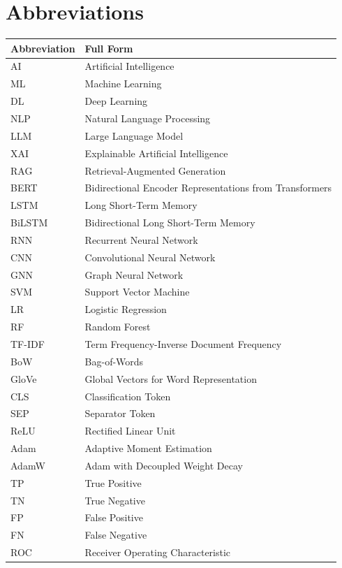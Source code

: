 \sloppy
\pagestyle{fancy}
\chapter*{\centering Abbreviations}

\begin{longtable}{p{1.6in} p{4.0in}}
\textbf{Abbreviation} & \textbf{Full Form} \\
\hline
\endhead
AI & Artificial Intelligence \\
ML & Machine Learning \\
DL & Deep Learning \\
NLP & Natural Language Processing \\
LLM & Large Language Model \\
XAI & Explainable Artificial Intelligence \\
RAG & Retrieval-Augmented Generation \\
BERT & Bidirectional Encoder Representations from Transformers \\
LSTM & Long Short-Term Memory \\
BiLSTM & Bidirectional Long Short-Term Memory \\
RNN & Recurrent Neural Network \\
CNN & Convolutional Neural Network \\
GNN & Graph Neural Network \\
SVM & Support Vector Machine \\
LR & Logistic Regression \\
RF & Random Forest \\
TF-IDF & Term Frequency-Inverse Document Frequency \\
BoW & Bag-of-Words \\
GloVe & Global Vectors for Word Representation \\
CLS & Classification Token \\
SEP & Separator Token \\
ReLU & Rectified Linear Unit \\
Adam & Adaptive Moment Estimation \\
AdamW & Adam with Decoupled Weight Decay \\
TP & True Positive \\
TN & True Negative \\
FP & False Positive \\
FN & False Negative \\
ROC & Receiver Operating Characteristic \\

\end{longtable}
